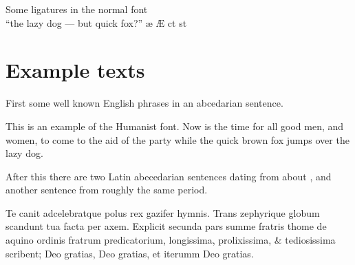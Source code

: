 \documentclass{article}
\newcommand{\Romannum}[1]{\uppercase\expandafter{\romannumeral #1}}
\newcommand{\Sentence}{%
This is an example of the Humanist font. Now is the time for all good
men, and women, to come to the aid of the party while the quick brown fox
jumps over the lazy dog.}
\newcommand{\latin}{Te canit adcelebratque polus rex gazifer hymnis.
  Trans zephyrique globum scandunt tua facta per axem.
  Explicit secunda pars summe fratris thome de aquino ordinis fratrum 
  predicatorium, longissima, prolixissima, \& tediosissima scribent;
  Deo gratias, Deo gratias, et iterumm Deo gratias. }
\begin{document}
\begin{center}
    Some ligatures in the normal font \\
{``the lazy dog --- but quick fox?'' \ae{} \AE{} ct st }
\end{center}

\section{Example texts}

    First some well known English phrases in an abcedarian sentence.

\Sentence{}

    After this there are two Latin abecedarian sentences dating from about 
\Romannum{790}, and another sentence from roughly the same period.

\latin{}

    
\end{document}
